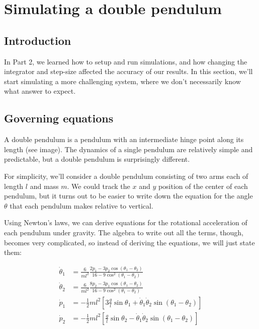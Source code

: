 \documentclass[main.tex]{subfiles}
\begin{document}
\chapter{Simulating a double pendulum}

\section{Introduction}

In Part 2, we learned how to setup and run simulations, and how changing the integrator and step-size affected the accuracy of our results.  
In this section, we'll start simulating a more challenging system, where we don't necessarily know what answer to expect.  

%
%
%
%
\section{Governing equations}

A double pendulum is a pendulum with an intermediate hinge point along its length (see image).  
The dynamics of a single pendulum are relatively simple and predictable, but a double pendulum is surprisingly different.

For simplicity, we'll consider a double pendulum consisting of two arms each of length $l$ and mass $m$.  
We could track the $x$ and $y$ position of the center of each pendulum, but it turns out to be easier to write down the equation for the angle $\theta$ that each pendulum makes relative to vertical.

Using Newton's laws, we can derive equations for the rotational acceleration of each pendulum under gravity.  
The algebra to write out all the terms, though, becomes very complicated, so instead of deriving the equations, we will just state them:

\begin{align}
    \dot{\theta}_1 &= \frac{6}{m l^2} \frac{2 p_1 - 3 p_2 \cos(\theta_1-\theta_2)}{16 - 9 \cos^2(\theta_1-\theta_2)} \\
    \dot{\theta}_2 &= \frac{6}{m l^2} \frac{8 p_2 - 3 p_1 \cos(\theta_1-\theta_2)}{16 - 9 \cos^2(\theta_1-\theta_2)} \\
    \dot{p}_1 &= -\frac{1}{2} m l^2 [3 \frac{g}{l} \sin \theta_1 + \dot{\theta}_1 \dot{\theta}_2 \sin(\theta_1-\theta_2)] \\
    \dot{p}_2 &= -\frac{1}{2} m l^2 [\frac{g}{l} \sin \theta_2 - \dot{\theta}_1 \dot{\theta}_2 \sin(\theta_1-\theta_2)] \\
\end{align}
\end{document}
